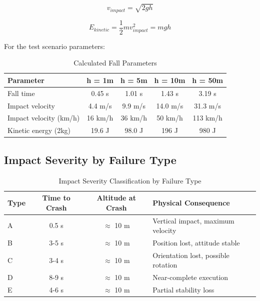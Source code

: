 \documentclass[11pt,a4paper]{article}
\begin{document}
\begin{equation}
v_{impact} = \sqrt{2gh}
\end{equation}

\begin{equation}
E_{kinetic} = \frac{1}{2}mv_{impact}^2 = mgh
\end{equation}

For the test scenario parameters:

\begin{table}[H]
\centering
\caption{Calculated Fall Parameters}
\label{tab:fall_params}
\begin{tabular}{@{}lcccc@{}}
\toprule
\textbf{Parameter} & \textbf{h = 1m} & \textbf{h = 5m} & \textbf{h = 10m} & \textbf{h = 50m} \\
\midrule
Fall time & 0.45 s & 1.01 s & 1.43 s & 3.19 s \\
Impact velocity & 4.4 m/s & 9.9 m/s & 14.0 m/s & 31.3 m/s \\
Impact velocity (km/h) & 16 km/h & 36 km/h & 50 km/h & 113 km/h \\
Kinetic energy (2kg) & 19.6 J & 98.0 J & 196 J & 980 J \\
\bottomrule
\end{tabular}
\end{table}

\subsection{Impact Severity by Failure Type}

\begin{table}[H]
\centering
\caption{Impact Severity Classification by Failure Type}
\label{tab:impact_severity}
\begin{tabular}{@{}lccp{5cm}@{}}
\toprule
\textbf{Type} & \textbf{Time to Crash} & \textbf{Altitude at Crash} & \textbf{Physical Consequence} \\
\midrule
A & 0.5 s & $\approx$ 10 m & Vertical impact, maximum velocity \\
B & 3-5 s & $\approx$ 10 m & Position lost, attitude stable \\
C & 3-4 s & $\approx$ 10 m & Orientation lost, possible rotation \\
D & 8-9 s & $\approx$ 10 m & Near-complete execution \\
E & 4-6 s & $\approx$ 10 m & Partial stability loss \\
\bottomrule
\end{tabular}
\end{table}
\end{document}
